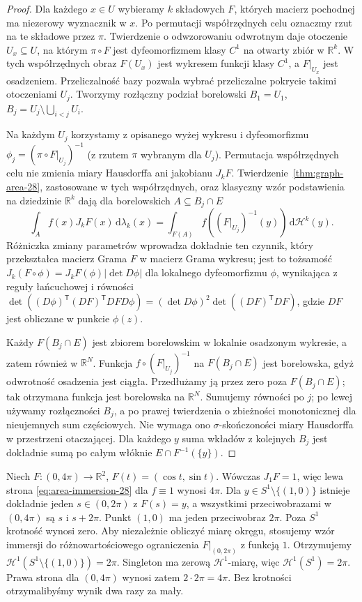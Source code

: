 \begin{proof}
Dla każdego $x\in U$ wybieramy $k$ składowych $F$,
których macierz pochodnej ma niezerowy wyznacznik w $x$.
Po permutacji współrzędnych celu oznaczmy rzut na te
składowe przez $\pi$. Twierdzenie o odwzorowaniu odwrotnym
daje otoczenie $U_x\subseteq U$, na którym
$\pi\circ F$ jest dyfeomorfizmem klasy $C^1$ na otwarty
zbiór w $\mathbb R^k$. W tych współrzędnych obraz $F(U_x)$
jest wykresem funkcji klasy $C^1$, a $F|_{U_x}$ jest osadzeniem.
Przeliczalność bazy pozwala wybrać przeliczalne
pokrycie takimi otoczeniami $U_j$. Tworzymy
rozłączny podział borelowski
$B_1=U_1$, $B_j=U_j\setminus\bigcup_{i<j}U_i$.

Na każdym $U_j$ korzystamy z opisanego wyżej wykresu
i dyfeomorfizmu $\phi_j=(\pi\circ F|_{U_j})^{-1}$
(z rzutem $\pi$ wybranym dla $U_j$).
Permutacja współrzędnych celu nie zmienia miary Hausdorffa
ani jakobianu $J_kF$.
Twierdzenie~\ref{thm:graph-area-28}, zastosowane
w tych współrzędnych, oraz klasyczny wzór
podstawienia na dziedzinie $\mathbb R^k$
dają dla borelowskich $A\subseteq B_j\cap E$
\[
 \int_A f(x)J_kF(x)\,\mathrm d\lambda_k(x)
 =\int_{F(A)}f((F|_{U_j})^{-1}(y))
 \,\mathrm d\mathcal H^k(y).
\]
Różniczka zmiany parametrów wprowadza dokładnie
ten czynnik, który przekształca macierz Grama
$F$ w macierz Grama wykresu; jest to tożsamość
$J_k(F\circ\phi)=J_kF(\phi)|\det D\phi|$
dla lokalnego dyfeomorfizmu $\phi$, wynikająca
z reguły łańcuchowej i równości
$\det((D\phi)^{\mathsf T}(DF)^{\mathsf T}DF D\phi)
=(\det D\phi)^2\det((DF)^{\mathsf T}DF)$,
gdzie $DF$ jest obliczane w punkcie $\phi(z)$.

Każdy $F(B_j\cap E)$ jest zbiorem borelowskim
w lokalnie osadzonym wykresie, a zatem również
w $\mathbb R^N$. Funkcja
$f\circ(F|_{U_j})^{-1}$ na $F(B_j\cap E)$
jest borelowska, gdyż odwrotność osadzenia jest ciągła.
Przedłużamy ją przez zero poza $F(B_j\cap E)$;
tak otrzymana funkcja jest borelowska na $\mathbb R^N$.
Sumujemy równości po $j$; po lewej używamy
rozłączności $B_j$, a po prawej twierdzenia
o zbieżności monotonicznej dla nieujemnych sum
częściowych. Nie wymaga ono $\sigma$-skończoności
miary Hausdorffa w przestrzeni otaczającej. Dla każdego $y$ suma
wkładów z kolejnych $B_j$ jest dokładnie sumą
po całym włóknie $E\cap F^{-1}(\{y\})$.
\end{proof}

\begin{przyklad}
Niech $F:(0,4\pi)\to\mathbb R^2$,
$F(t)=(\cos t,\sin t)$. Wówczas $J_1F=1$,
więc lewa strona \eqref{eq:area-immersion-28}
dla $f\equiv1$ wynosi $4\pi$.
Dla $y\in S^1\setminus\{(1,0)\}$ istnieje dokładnie
jeden $s\in(0,2\pi)$ z $F(s)=y$, a wszystkimi
przeciwobrazami w $(0,4\pi)$ są $s$ i $s+2\pi$.
Punkt $(1,0)$ ma jeden przeciwobraz $2\pi$.
Poza $S^1$ krotność wynosi zero.
Aby niezależnie obliczyć miarę okręgu, stosujemy
wzór immersji do różnowartościowego ograniczenia
$F|_{(0,2\pi)}$ z funkcją $1$. Otrzymujemy
$\mathcal H^1(S^1\setminus\{(1,0)\})=2\pi$.
Singleton ma zerową $\mathcal H^1$-miarę, więc
$\mathcal H^1(S^1)=2\pi$. Prawa strona dla
$(0,4\pi)$ wynosi zatem $2\cdot2\pi=4\pi$.
Bez krotności otrzymalibyśmy wynik dwa razy za mały.
\end{przyklad}

